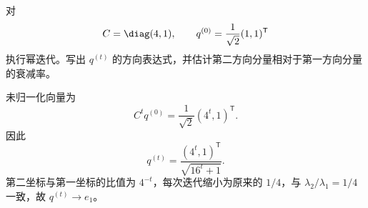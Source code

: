 \begin{exercise}[level=advanced]
对
\[
C=\diag(4,1),
\qquad q^{(0)}=\frac1{\sqrt2}(1,1)^{\mathsf T}
\]
执行幂迭代。写出 $q^{(t)}$ 的方向表达式，并估计第二方向分量相对于第一方向分量的衰减率。
\begin{solution}
未归一化向量为
\[
C^tq^{(0)}=\frac1{\sqrt2}(4^t,1)^{\mathsf T}.
\]
因此
\[
q^{(t)}=\frac{(4^t,1)^{\mathsf T}}{\sqrt{16^t+1}}.
\]
第二坐标与第一坐标的比值为 $4^{-t}$，每次迭代缩小为原来的 $1/4$，与
$\lambda_2/\lambda_1=1/4$ 一致，故 $q^{(t)}\to e_1$。
\end{solution}
\end{exercise}

